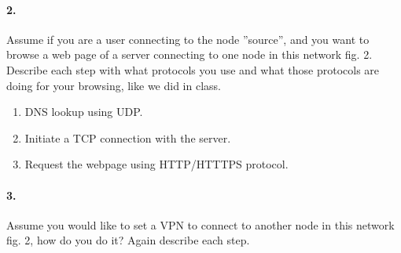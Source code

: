 \documentclass{article}
\begin{document}
\paragraph{2.} Assume if you are a user connecting to the node ”source”, and you want to browse a web page of a server connecting to one node in this network fig. 2. Describe each step with what protocols you use and what those protocols are doing for your browsing, like we did in class.

\begin{enumerate}
    \item DNS lookup using UDP.
    \item Initiate a TCP connection with the server.
    \item Request the webpage using HTTP/HTTTPS protocol.
\end{enumerate}

\paragraph{3.} Assume you would like to set a VPN to connect to another node in this network fig. 2, how do you do it? Again describe each step.
\end{document}
